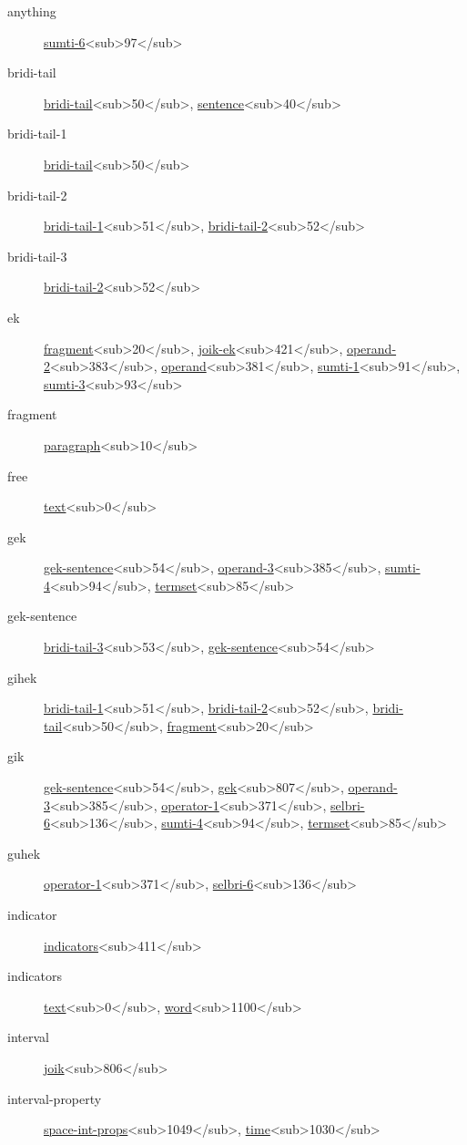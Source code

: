 \begin{description}
\item[anything] \hyperref[html:b97]{sumti-6}<sub>97</sub>
\item[bridi-tail] \hyperref[html:b50]{bridi-tail}<sub>50</sub>, \hyperref[html:b40]{sentence}<sub>40</sub>
\item[bridi-tail-1] \hyperref[html:b50]{bridi-tail}<sub>50</sub>
\item[bridi-tail-2] \hyperref[html:b51]{bridi-tail-1}<sub>51</sub>, \hyperref[html:b52]{bridi-tail-2}<sub>52</sub>
\item[bridi-tail-3] \hyperref[html:b52]{bridi-tail-2}<sub>52</sub>
\item[ek] \hyperref[html:b20]{fragment}<sub>20</sub>, \hyperref[html:b421]{joik-ek}<sub>421</sub>, \hyperref[html:b383]{operand-2}<sub>383</sub>, \hyperref[html:b381]{operand}<sub>381</sub>, \hyperref[html:b91]{sumti-1}<sub>91</sub>, \hyperref[html:b93]{sumti-3}<sub>93</sub>
\item[fragment] \hyperref[html:b10]{paragraph}<sub>10</sub>
\item[free] \hyperref[html:b0]{text}<sub>0</sub>
\item[gek] \hyperref[html:b54]{gek-sentence}<sub>54</sub>, \hyperref[html:b385]{operand-3}<sub>385</sub>, \hyperref[html:b94]{sumti-4}<sub>94</sub>, \hyperref[html:b85]{termset}<sub>85</sub>
\item[gek-sentence] \hyperref[html:b53]{bridi-tail-3}<sub>53</sub>, \hyperref[html:b54]{gek-sentence}<sub>54</sub>
\item[gihek] \hyperref[html:b51]{bridi-tail-1}<sub>51</sub>, \hyperref[html:b52]{bridi-tail-2}<sub>52</sub>, \hyperref[html:b50]{bridi-tail}<sub>50</sub>, \hyperref[html:b20]{fragment}<sub>20</sub>
\item[gik] \hyperref[html:b54]{gek-sentence}<sub>54</sub>, \hyperref[html:b807]{gek}<sub>807</sub>, \hyperref[html:b385]{operand-3}<sub>385</sub>, \hyperref[html:b371]{operator-1}<sub>371</sub>, \hyperref[html:b136]{selbri-6}<sub>136</sub>, \hyperref[html:b94]{sumti-4}<sub>94</sub>, \hyperref[html:b85]{termset}<sub>85</sub>
\item[guhek] \hyperref[html:b371]{operator-1}<sub>371</sub>, \hyperref[html:b136]{selbri-6}<sub>136</sub>
\item[indicator] \hyperref[html:b411]{indicators}<sub>411</sub>
\item[indicators] \hyperref[html:b0]{text}<sub>0</sub>, \hyperref[html:b1100]{word}<sub>1100</sub>
\item[interval] \hyperref[html:b806]{joik}<sub>806</sub>
\item[interval-property] \hyperref[html:b1049]{space-int-props}<sub>1049</sub>, \hyperref[html:b1030]{time}<sub>1030</sub>

\end{description}
